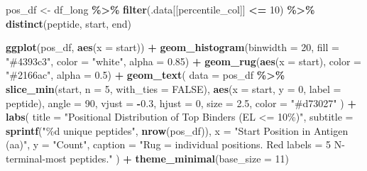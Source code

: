 \documentclass[
]{article}
\newenvironment{Shaded}{\begin{snugshade}}{\end{snugshade}}
\newcommand{\AttributeTok}[1]{\textcolor[rgb]{0.13,0.29,0.53}{#1}}
\newcommand{\ConstantTok}[1]{\textcolor[rgb]{0.56,0.35,0.01}{#1}}
\newcommand{\DecValTok}[1]{\textcolor[rgb]{0.00,0.00,0.81}{#1}}
\newcommand{\FloatTok}[1]{\textcolor[rgb]{0.00,0.00,0.81}{#1}}
\newcommand{\FunctionTok}[1]{\textcolor[rgb]{0.13,0.29,0.53}{\textbf{#1}}}
\newcommand{\NormalTok}[1]{#1}
\newcommand{\OtherTok}[1]{\textcolor[rgb]{0.56,0.35,0.01}{#1}}
\newcommand{\SpecialCharTok}[1]{\textcolor[rgb]{0.81,0.36,0.00}{\textbf{#1}}}
\newcommand{\StringTok}[1]{\textcolor[rgb]{0.31,0.60,0.02}{#1}}
\begin{document}
\begin{Shaded}
\begin{Highlighting}[]
\NormalTok{pos\_df }\OtherTok{\textless{}{-}}\NormalTok{ df\_long }\SpecialCharTok{\%\textgreater{}\%}
  \FunctionTok{filter}\NormalTok{(.data[[percentile\_col]] }\SpecialCharTok{\textless{}=} \DecValTok{10}\NormalTok{) }\SpecialCharTok{\%\textgreater{}\%}
  \FunctionTok{distinct}\NormalTok{(peptide, start, end)}

\FunctionTok{ggplot}\NormalTok{(pos\_df, }\FunctionTok{aes}\NormalTok{(}\AttributeTok{x =}\NormalTok{ start)) }\SpecialCharTok{+}
  \FunctionTok{geom\_histogram}\NormalTok{(}\AttributeTok{binwidth =} \DecValTok{20}\NormalTok{, }\AttributeTok{fill =} \StringTok{"\#4393c3"}\NormalTok{, }\AttributeTok{color =} \StringTok{"white"}\NormalTok{, }\AttributeTok{alpha =} \FloatTok{0.85}\NormalTok{) }\SpecialCharTok{+}
  \FunctionTok{geom\_rug}\NormalTok{(}\FunctionTok{aes}\NormalTok{(}\AttributeTok{x =}\NormalTok{ start), }\AttributeTok{color =} \StringTok{"\#2166ac"}\NormalTok{, }\AttributeTok{alpha =} \FloatTok{0.5}\NormalTok{) }\SpecialCharTok{+}
  \FunctionTok{geom\_text}\NormalTok{(}
    \AttributeTok{data  =}\NormalTok{ pos\_df }\SpecialCharTok{\%\textgreater{}\%} \FunctionTok{slice\_min}\NormalTok{(start, }\AttributeTok{n =} \DecValTok{5}\NormalTok{, }\AttributeTok{with\_ties =} \ConstantTok{FALSE}\NormalTok{),}
    \FunctionTok{aes}\NormalTok{(}\AttributeTok{x =}\NormalTok{ start, }\AttributeTok{y =} \DecValTok{0}\NormalTok{, }\AttributeTok{label =}\NormalTok{ peptide),}
    \AttributeTok{angle =} \DecValTok{90}\NormalTok{, }\AttributeTok{vjust =} \SpecialCharTok{{-}}\FloatTok{0.3}\NormalTok{, }\AttributeTok{hjust =} \DecValTok{0}\NormalTok{, }\AttributeTok{size =} \FloatTok{2.5}\NormalTok{, }\AttributeTok{color =} \StringTok{"\#d73027"}
\NormalTok{  ) }\SpecialCharTok{+}
  \FunctionTok{labs}\NormalTok{(}
    \AttributeTok{title    =} \StringTok{"Positional Distribution of Top Binders (EL \textless{}= 10\%)"}\NormalTok{,}
    \AttributeTok{subtitle =} \FunctionTok{sprintf}\NormalTok{(}\StringTok{"\%d unique peptides"}\NormalTok{, }\FunctionTok{nrow}\NormalTok{(pos\_df)),}
    \AttributeTok{x        =} \StringTok{"Start Position in Antigen (aa)"}\NormalTok{,}
    \AttributeTok{y        =} \StringTok{"Count"}\NormalTok{,}
    \AttributeTok{caption  =} \StringTok{"Rug = individual positions. Red labels = 5 N{-}terminal{-}most peptides."}
\NormalTok{  ) }\SpecialCharTok{+}
  \FunctionTok{theme\_minimal}\NormalTok{(}\AttributeTok{base\_size =} \DecValTok{11}\NormalTok{)}
\end{Highlighting}
\end{Shaded}
\end{document}
